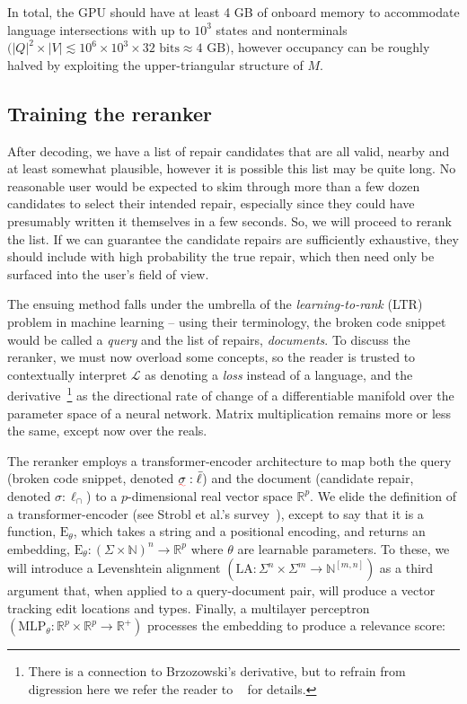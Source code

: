 \documentclass[sigplan,review,acmsmall,nonacm,screen,anonymous]{acmart}\settopmatter{printfolios=false,printccs=false,printacmref=false}
\begin{document}
In total, the GPU should have at least 4 GB of onboard memory to accommodate language intersections with up to $10^3$ states and nonterminals $\big(|Q|^2\times|V| \lesssim 10^6\times10^3\times 32 \text{ bits} \approx \text{4 GB}\big)$, however occupancy can be roughly halved by exploiting the upper-triangular structure of $M$.

\clearpage\subsection{Training the reranker}

After decoding, we have a list of repair candidates that are all valid, nearby and at least somewhat plausible, however it is possible this list may be quite long. No reasonable user would be expected to skim through more than a few dozen candidates to select their intended repair, especially since they could have presumably written it themselves in a few seconds. So, we will proceed to rerank the list. If we can guarantee the candidate repairs are sufficiently exhaustive, they should include with high probability the true repair, which then need only be surfaced into the user's field of view.

The ensuing method falls under the umbrella of the \textit{learning-to-rank} (LTR) problem in machine learning -- using their terminology, the broken code snippet would be called a \textit{query} and the list of repairs, \textit{documents}. To discuss the reranker, we must now overload some concepts, so the reader is trusted to contextually interpret $\mathcal{L}$ as denoting a \textit{loss} instead of a language, and the derivative~\footnote{There is a connection to Brzozowski's derivative, but to refrain from digression here we refer the reader to ~\cite{elliott2019generalized} for details.} as the directional rate of change of a differentiable manifold over the parameter space of a neural network. Matrix multiplication remains more or less the same, except now over the reals.

The reranker employs a transformer-encoder architecture to map both the query (broken code snippet, denoted $\err\sigma: \bar\ell$) and the document (candidate repair, denoted $\sigma: \ell_\cap$) to a $p$-dimensional real vector space $\mathbb{R}^p$. We elide the definition of a transformer-encoder (see Strobl et al.'s survey~\cite{strobl2024formal}), except to say that it is a function, $\text{E}_\theta$, which takes a string and a positional encoding, and returns an embedding, $\text{E}_\theta: (\Sigma\times \mathbb{N})^n \rightarrow \mathbb{R}^p$ where $\theta$ are learnable parameters. To these, we will introduce a Levenshtein alignment $(\text{LA}: \Sigma^n \times \Sigma^m \rightarrow \mathbb{N}^{[m, n]})$ as a third argument that, when applied to a query-document pair, will produce a vector tracking edit locations and types. Finally, a multilayer perceptron $(\text{MLP}_\theta: \mathbb{R}^p \times \mathbb{R}^p \rightarrow \mathbb{R}^+)$ processes the embedding to produce a relevance score:
\end{document}
